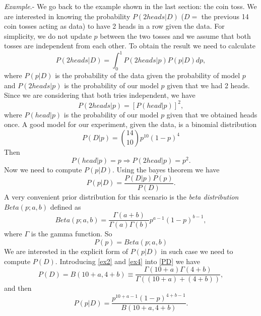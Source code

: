 \documentclass[onecolumn,           %
               showpacs,            %
               preprintnumbers,     %
               aps,                 %
               prl,          	    %
               letterpaper,             %
               superscriptaddress,      %
               nofootinbib,         %
               tightenlines,        %
               floats,floatfix      %
               ,usenatbib,
               ]{revtex4-1}
\begin{document}
\textit{Example}.- We go back to the example shown in the last section: the coin toss. We are interested in knowing the probability $P(2heads|D)$ ($D=$ the previous 14 coin tosses acting as data) to have 2 heads in a row given the data. For simplicity, we do not update $p$ between the two tosses and we assume that both tosses are independent from each other. To obtain the result we need to calculate
\begin{equation}\label{ex}
P(2heads|D)=\int^1_0 P(2heads|p)P(p|D)dp,
\end{equation}
where $P(p|D)$ is the probability of the data given the probability of model $p$ and $P(2heads|p)$ is the probability of our model $p$ given that we had 2 heads. Since we are considering that both tries independent, we have
\begin{equation}
P(2heads|p)=[P(head|p)]^2 ,
\end{equation}
where $P(head|p)$ is the probability of our model $p$ given that we obtained heads once. A good model for our experiment, given the data, is a binomial distribution
\begin{equation}\label{ex2}
P(D|p)=\binom{14}{10}p^{10}(1-p)^4
\end{equation}
Then 
\begin{equation}\label{ex1}
P(head|p)=p\Rightarrow P(2head|p)=p^2.
\end{equation}
Now we need to compute $P(p|D)$. Using the bayes theorem we have
\begin{equation}
P(p|D)=\frac{P(D|p)P(p)}{P(D)}.
\end{equation}
A very convenient prior distribution for this scenario is the \textit{beta distribution} $Beta(p;a,b)$ defined as
\begin{equation}\label{ex3}
Beta(p;a,b)=\frac{\Gamma(a+b)}{\Gamma(a)\Gamma(b)}p^{a-1}(1-p)^{b-1},
\end{equation}
where $\Gamma$ is the gamma function. So
\begin{equation}\label{ex4}
P(p)=Beta(p;a,b)
\end{equation}
We are interested in the explicit form of $P(p|D)$ in such case we need to compute $P(D)$. Introducing \eqref{ex2} and \eqref{ex4} into \eqref{PD} we have
\begin{equation}
P(D)=B(10+a,4+b)\equiv \frac{\Gamma(10+a)\Gamma(4+b)}{\Gamma((10+a)+(4+b))},
\end{equation}
and then
\begin{equation}\label{ex5}
P(p|D)=\frac{p^{10+a-1}(1-p)^{4+b-1}}{B(10+a,4+b)}.
\end{equation}
\end{document}
